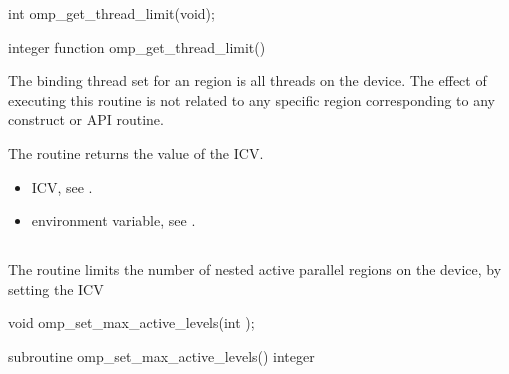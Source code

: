 \format
\ccppspecificstart
\begin{boxedcode}
int omp\_get\_thread\_limit(void);
\end{boxedcode}
\ccppspecificend

\fortranspecificstart
\begin{boxedcode}
integer function omp\_get\_thread\_limit()
\end{boxedcode}
\fortranspecificend

\binding
The binding thread set for an  region is all threads on the 
device. The effect of executing this routine is not related to any specific region 
corresponding to any construct or API routine. 

\effect
The  routine returns the value of the  ICV.

\crossreferences
\begin{itemize}
\item {} ICV, see 
.

\item {} environment variable, see 
.
\end{itemize}









\subsection{}
\label{subsec:omp_set_max_active_levels}
\summary
The  routine limits the number of nested active 
parallel regions on the device, by setting the  ICV

\format
\ccppspecificstart
\begin{boxedcode}
void omp\_set\_max\_active\_levels(int );
\end{boxedcode}
\ccppspecificend

\fortranspecificstart
\begin{boxedcode}
subroutine omp\_set\_max\_active\_levels()
integer 
\end{boxedcode}
\fortranspecificend

